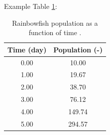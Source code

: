 Example Table \ref{table:Rainbowfish}:
\begin{table}[!htbp]
    \centering
    \caption[Rainbowfish population as a function of time]{Rainbowfish population as a function of time \citep{tudelftopencourseware}.}
    \begin{tabular}{c|c}
        Time (day) & Population (-) \\
        \hline
        0.00       & 10.00          \\
        1.00       & 19.67          \\
        2.00       & 38.70          \\
        3.00       & 76.12          \\
        4.00       & 149.74         \\
        5.00       & 294.57
    \end{tabular}
    \label{table:Rainbowfish}
\end{table}